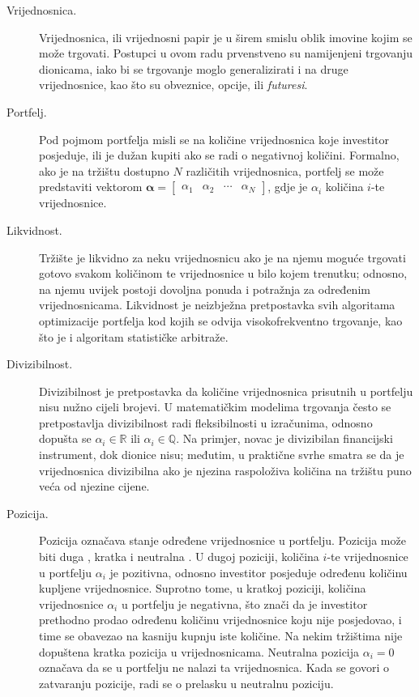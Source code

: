 \documentclass[lmodern, utf8, diplomski, numeric]{fer}
\newcommand{\matr}[1]{\mathbold{#1}}
\begin{document}
  \begin{description}
    \item[Vrijednosnica.] Vrijednosnica, ili vrijednosni papir  je u širem smislu oblik imovine kojim se može trgovati.
    Postupci u ovom radu prvenstveno su namijenjeni trgovanju dionicama, iako bi se trgovanje moglo generalizirati i na druge vrijednosnice, kao što su obveznice, opcije, ili \textit{futuresi}.
    
    \item[Portfelj.] Pod pojmom portfelja misli se na količine vrijednosnica koje investitor posjeduje, ili je dužan kupiti ako se radi o negativnoj količini.
    Formalno, ako je na tržištu dostupno $N$ različitih vrijednosnica, portfelj se može predstaviti vektorom $\matr{\alpha} = \begin{bmatrix} \alpha_1 & \alpha_2 & \cdots & \alpha_N \end{bmatrix}$, gdje je $\alpha_i$ količina $i$-te vrijednosnice.
    
    \item[Likvidnost.]
    Tržište je likvidno za neku vrijednosnicu ako je na njemu moguće trgovati gotovo svakom količinom te vrijednosnice u bilo kojem trenutku; odnosno, na njemu uvijek postoji dovoljna ponuda i potražnja za određenim vrijednosnicama.
    Likvidnost je neizbježna pretpostavka svih algoritama optimizacije portfelja kod kojih se odvija visokofrekventno trgovanje, kao što je i algoritam statističke arbitraže.
    
    \item[Divizibilnost.]
    Divizibilnost je pretpostavka da količine vrijednosnica prisutnih u portfelju nisu nužno cijeli brojevi.
    U matematičkim modelima trgovanja često se pretpostavlja divizibilnost radi fleksibilnosti u izračunima, odnosno dopušta se $\alpha_i \in \mathbb{R}$ ili $\alpha_i \in \mathbb{Q}$.
    Na primjer, novac je divizibilan financijski instrument, dok dionice nisu; međutim, u praktične svrhe smatra se da je vrijednosnica divizibilna ako je njezina raspoloživa količina na tržištu puno veća od njezine cijene.
    
    \item[Pozicija.]
    Pozicija označava stanje određene vrijednosnice u portfelju.
    Pozicija može biti duga , kratka  i neutralna .
    U dugoj poziciji, količina $i$-te vrijednosnice u portfelju $\alpha_i$ je pozitivna, odnosno investitor posjeduje određenu količinu kupljene vrijednosnice.
    Suprotno tome, u kratkoj poziciji, količina vrijednosnice $\alpha_i$ u portfelju je negativna, što znači da je investitor prethodno prodao određenu količinu vrijednosnice koju nije posjedovao, i time se obavezao na kasniju kupnju iste količine.
    Na nekim tržištima nije dopuštena kratka pozicija u vrijednosnicama.
    Neutralna pozicija $\alpha_i = 0$ označava da se u portfelju ne nalazi ta vrijednosnica.
    Kada se govori o zatvaranju pozicije, radi se o prelasku u neutralnu poziciju.
    

\end{description}
\end{document}
